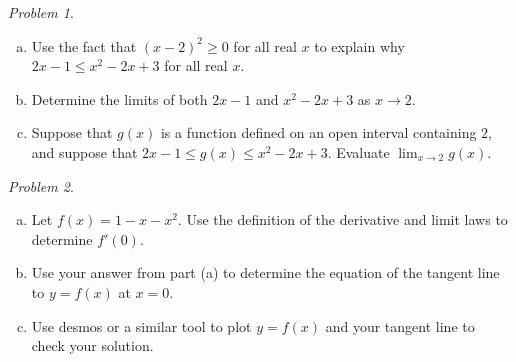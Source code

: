 \documentclass[11pt,twoside]{amsart}
\theoremstyle{plain}
\theoremstyle{remark}
\newtheorem{prob}{Problem}
\theoremstyle{definition}
\theoremstyle{definition}
\begin{document}
\begin{prob}
\begin{enumerate}[(a)]
\item Use the fact that $(x-2)^2\ge 0$ for all real $x$ to explain why $2x-1\le x^2-2x+3$ for all real $x$.
\item Determine the limits of both $2x-1$ and $x^2-2x+3$ as $x\to 2$.
\item Suppose that $g(x)$ is a function defined on an open interval containing $2$, and suppose that $2x-1\le g(x)\le x^2-2x+3$. Evaluate $\lim_{x\to 2}g(x)$.
\end{enumerate}
\end{prob}

\begin{prob}
\begin{enumerate}[(a)]
\item Let $f(x) = 1-x-x^2$. Use the definition of the derivative and limit laws to determine $f'(0)$.
\item Use your answer from part (a) to determine the equation of the tangent line to $y=f(x)$ at $x=0$.
\item Use desmos or a similar tool to plot $y=f(x)$ and your tangent line to check your solution.
\end{enumerate}
\end{prob}
\end{document}
